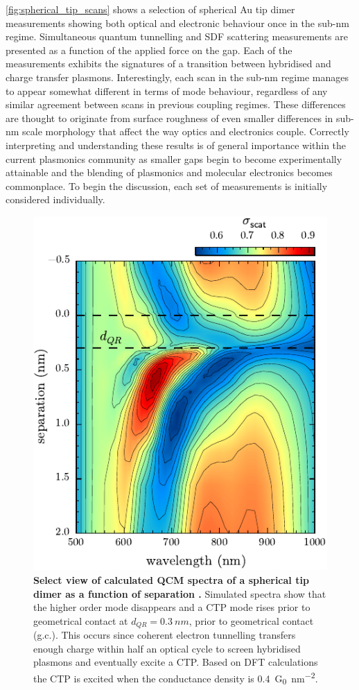 \documentclass[a4paper]{article}
\begin{document}
\autoref{fig:spherical_tip_scans} shows a selection of spherical Au tip dimer measurements showing both optical and electronic behaviour once in the sub-nm regime. Simultaneous quantum tunnelling and SDF scattering measurements are presented as a function of the applied force on the gap. Each of the measurements exhibits the signatures of a transition between hybridised and charge transfer plasmons. Interestingly, each scan in the sub-nm regime manages to appear somewhat different in terms of mode behaviour, regardless of any similar agreement between scans in previous coupling regimes. These differences are thought to originate from surface roughness of even smaller differences in sub-nm scale morphology that affect the way optics and electronics couple. Correctly interpreting and understanding these results is of general importance within the current plasmonics community as smaller gaps begin to become experimentally attainable and the blending of plasmonics and molecular electronics becomes commonplace. To begin the discussion, each set of measurements is initially considered individually.

\begin{figure}[bt]
\centering
\includegraphics{figures/qcm_tip_theory_zoom}
\caption[Select view of calculated QCM spectra of a spherical tip dimer as a function of separation \cite{savage2012}]{\textbf{Select view of calculated QCM spectra of a spherical tip dimer as a function of separation \cite{savage2012}.} Simulated spectra show that the higher order mode disappears and a CTP mode rises prior to geometrical contact at $d_{QR}=\SI{0.3}{nm}$, prior to geometrical contact (g.c.). This occurs since coherent electron tunnelling transfers enough charge within half an optical cycle to screen hybridised plasmons and eventually excite a CTP. Based on DFT calculations the CTP is excited when the conductance density is \SI{0.4}{G_0.nm^{-2}}.}
\label{fig:qcm_tip_theory}
\end{figure}
\end{document}
